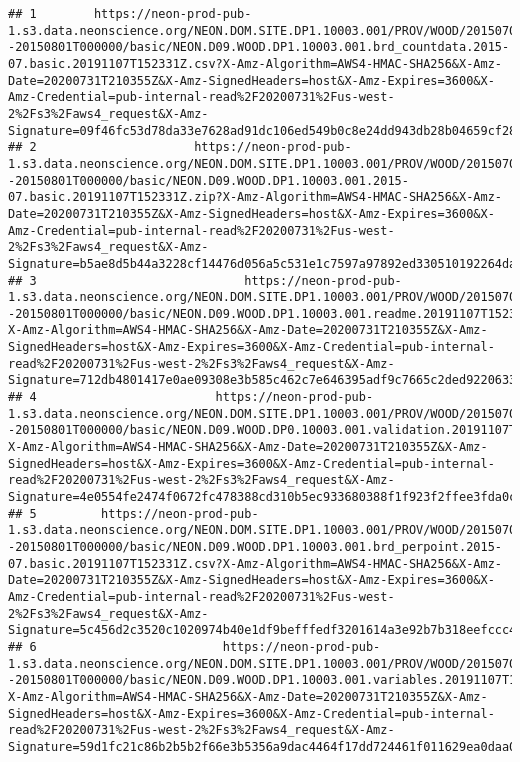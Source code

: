 \documentclass[]{book}
\begin{document}
\begin{verbatim}
## 1        https://neon-prod-pub-1.s3.data.neonscience.org/NEON.DOM.SITE.DP1.10003.001/PROV/WOOD/20150701T000000--20150801T000000/basic/NEON.D09.WOOD.DP1.10003.001.brd_countdata.2015-07.basic.20191107T152331Z.csv?X-Amz-Algorithm=AWS4-HMAC-SHA256&X-Amz-Date=20200731T210355Z&X-Amz-SignedHeaders=host&X-Amz-Expires=3600&X-Amz-Credential=pub-internal-read%2F20200731%2Fus-west-2%2Fs3%2Faws4_request&X-Amz-Signature=09f46fc53d78da33e7628ad91dc106ed549b0c8e24dd943db28b04659cf28c77
## 2                      https://neon-prod-pub-1.s3.data.neonscience.org/NEON.DOM.SITE.DP1.10003.001/PROV/WOOD/20150701T000000--20150801T000000/basic/NEON.D09.WOOD.DP1.10003.001.2015-07.basic.20191107T152331Z.zip?X-Amz-Algorithm=AWS4-HMAC-SHA256&X-Amz-Date=20200731T210355Z&X-Amz-SignedHeaders=host&X-Amz-Expires=3600&X-Amz-Credential=pub-internal-read%2F20200731%2Fus-west-2%2Fs3%2Faws4_request&X-Amz-Signature=b5ae8d5b44a3228cf14476d056a5c531e1c7597a97892ed330510192264da61d
## 3                             https://neon-prod-pub-1.s3.data.neonscience.org/NEON.DOM.SITE.DP1.10003.001/PROV/WOOD/20150701T000000--20150801T000000/basic/NEON.D09.WOOD.DP1.10003.001.readme.20191107T152331Z.txt?X-Amz-Algorithm=AWS4-HMAC-SHA256&X-Amz-Date=20200731T210355Z&X-Amz-SignedHeaders=host&X-Amz-Expires=3600&X-Amz-Credential=pub-internal-read%2F20200731%2Fus-west-2%2Fs3%2Faws4_request&X-Amz-Signature=712db4801417e0ae09308e3b585c462c7e646395adf9c7665c2ded9220633c08
## 4                         https://neon-prod-pub-1.s3.data.neonscience.org/NEON.DOM.SITE.DP1.10003.001/PROV/WOOD/20150701T000000--20150801T000000/basic/NEON.D09.WOOD.DP0.10003.001.validation.20191107T152331Z.csv?X-Amz-Algorithm=AWS4-HMAC-SHA256&X-Amz-Date=20200731T210355Z&X-Amz-SignedHeaders=host&X-Amz-Expires=3600&X-Amz-Credential=pub-internal-read%2F20200731%2Fus-west-2%2Fs3%2Faws4_request&X-Amz-Signature=4e0554fe2474f0672fc478388cd310b5ec933680388f1f923f2ffee3fda0c9c2
## 5         https://neon-prod-pub-1.s3.data.neonscience.org/NEON.DOM.SITE.DP1.10003.001/PROV/WOOD/20150701T000000--20150801T000000/basic/NEON.D09.WOOD.DP1.10003.001.brd_perpoint.2015-07.basic.20191107T152331Z.csv?X-Amz-Algorithm=AWS4-HMAC-SHA256&X-Amz-Date=20200731T210355Z&X-Amz-SignedHeaders=host&X-Amz-Expires=3600&X-Amz-Credential=pub-internal-read%2F20200731%2Fus-west-2%2Fs3%2Faws4_request&X-Amz-Signature=5c456d2c3520c1020974b40e1df9befffedf3201614a3e92b7b318eefccc4217
## 6                          https://neon-prod-pub-1.s3.data.neonscience.org/NEON.DOM.SITE.DP1.10003.001/PROV/WOOD/20150701T000000--20150801T000000/basic/NEON.D09.WOOD.DP1.10003.001.variables.20191107T152331Z.csv?X-Amz-Algorithm=AWS4-HMAC-SHA256&X-Amz-Date=20200731T210355Z&X-Amz-SignedHeaders=host&X-Amz-Expires=3600&X-Amz-Credential=pub-internal-read%2F20200731%2Fus-west-2%2Fs3%2Faws4_request&X-Amz-Signature=59d1fc21c86b2b5b2f66e3b5356a9dac4464f17dd724461f011629ea0daa0a6c

\end{verbatim}
\end{document}
